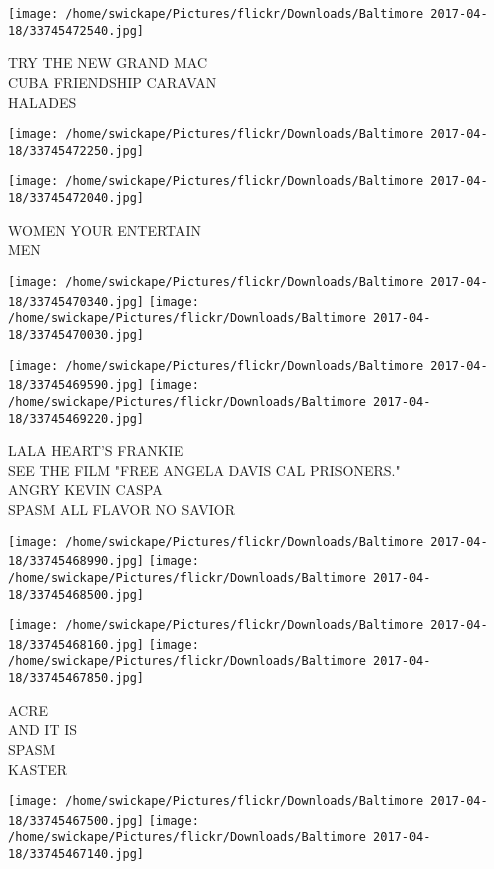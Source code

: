 \documentclass[10pt,letterpaper]{article}
\begin{document}
\texttt{[image: /home/swickape/Pictures/flickr/Downloads/Baltimore 2017-04-18/33745472540.jpg]}

TRY THE NEW GRAND MAC\\
CUBA FRIENDSHIP CARAVAN\\
HALADES\\
\pagebreak

\texttt{[image: /home/swickape/Pictures/flickr/Downloads/Baltimore 2017-04-18/33745472250.jpg]}

\vspace{0.25in}
\texttt{[image: /home/swickape/Pictures/flickr/Downloads/Baltimore 2017-04-18/33745472040.jpg]}

WOMEN YOUR ENTERTAIN\\
MEN\\
\pagebreak

\texttt{[image: /home/swickape/Pictures/flickr/Downloads/Baltimore 2017-04-18/33745470340.jpg]}
\texttt{[image: /home/swickape/Pictures/flickr/Downloads/Baltimore 2017-04-18/33745470030.jpg]}

\texttt{[image: /home/swickape/Pictures/flickr/Downloads/Baltimore 2017-04-18/33745469590.jpg]}
\texttt{[image: /home/swickape/Pictures/flickr/Downloads/Baltimore 2017-04-18/33745469220.jpg]}

LALA HEART'S FRANKIE\\
SEE THE FILM "FREE ANGELA DAVIS CAL PRISONERS."\\
ANGRY KEVIN CASPA\\
SPASM ALL FLAVOR NO SAVIOR\\
\pagebreak

\texttt{[image: /home/swickape/Pictures/flickr/Downloads/Baltimore 2017-04-18/33745468990.jpg]}
\texttt{[image: /home/swickape/Pictures/flickr/Downloads/Baltimore 2017-04-18/33745468500.jpg]}

\texttt{[image: /home/swickape/Pictures/flickr/Downloads/Baltimore 2017-04-18/33745468160.jpg]}
\texttt{[image: /home/swickape/Pictures/flickr/Downloads/Baltimore 2017-04-18/33745467850.jpg]}

ACRE\\
AND IT IS\\
SPASM\\
KASTER\\
\pagebreak

\texttt{[image: /home/swickape/Pictures/flickr/Downloads/Baltimore 2017-04-18/33745467500.jpg]}
\texttt{[image: /home/swickape/Pictures/flickr/Downloads/Baltimore 2017-04-18/33745467140.jpg]}
\end{document}
